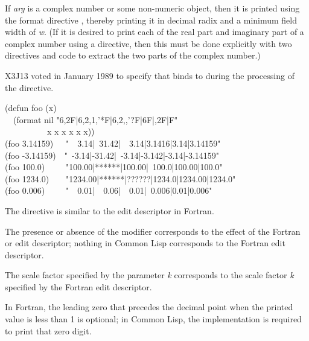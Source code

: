 \begin{flushdesc}
If {\it arg} is a complex number or some non-numeric
object, then it is printed using the format directive ,
thereby printing it in decimal radix and a minimum field width of {\it w}.
(If it is desired to print each of the real part and imaginary part
of a complex number using a  directive, then this must
be done explicitly with two  directives and code to
extract the two parts of the complex number.)

\begin{new}
X3J13 voted in January 1989
to specify that  binds  to 
during the processing of the  directive.
\end{new}

\begin{lisp}
(defun foo (x) \\
~~(format nil "{\Xtilde}6,2F|{\Xtilde}6,2,1,'*F|{\Xtilde}6,2,,'?F|{\Xtilde}6F|{\Xtilde},2F|{\Xtilde}F" \\
~~~~~~~~~~x x x x x x)) \\
(foo 3.14159)~~\EV\ "~~3.14|~31.42|~~3.14|3.1416|3.14|3.14159" \\
(foo -3.14159)~\EV\ "~-3.14|-31.42|~-3.14|-3.142|-3.14|-3.14159" \\
(foo 100.0)~~~~\EV\ "100.00|******|100.00|~100.0|100.00|100.0" \\
(foo 1234.0)~~~\EV\ "1234.00|******|??????|1234.0|1234.00|1234.0" \\
(foo 0.006)~~~~\EV\ "~~0.01|~~0.06|~~0.01|~0.006|0.01|0.006"
\end{lisp}

\beforenoterule
\begin{incompatibility}
The  directive is similar to the
 edit descriptor in Fortran.

The presence
or absence of the \cd{{\Xatsign}} modifier corresponds to the effect of
the Fortran  or  edit descriptor; nothing in Common Lisp
corresponds to the Fortran  edit descriptor.

The scale factor
specified by the parameter {\it k} corresponds to the scale factor {\it k}
specified by the Fortran  edit descriptor.

In Fortran, the leading zero that precedes the decimal point when
the printed value is less than 1 is optional; in Common Lisp, the implementation
is required to print that zero digit.


\end{incompatibility}
\end{flushdesc}
